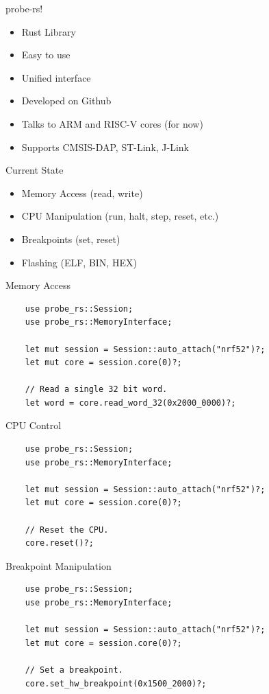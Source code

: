 \documentclass[aspectratio=1610,14pt,t]{beamer}
\begin{document}
\begin{frame}[c]{probe-rs!}
  \begin{itemize}
    \item Rust Library
    \item Easy to use
    \item Unified interface
    \item Developed on Github
    \item Talks to ARM and RISC-V cores (for now)
    \item Supports CMSIS-DAP, ST-Link, J-Link
  \end{itemize}
\end{frame}

\begin{frame}[c]{Current State}
  \begin{itemize}
    \item Memory Access (read, write)
    \item CPU Manipulation (run, halt, step, reset, etc.)
    \item Breakpoints (set, reset)
    \item Flashing (ELF, BIN, HEX)
  \end{itemize}
\end{frame}

\begin{frame}[c,fragile]{Memory Access}
  \begin{verbatim}
    use probe_rs::Session;
    use probe_rs::MemoryInterface;

    let mut session = Session::auto_attach("nrf52")?;
    let mut core = session.core(0)?;

    // Read a single 32 bit word.
    let word = core.read_word_32(0x2000_0000)?;
  \end{verbatim}
\end{frame}

\begin{frame}[c,fragile]{CPU Control}
  \begin{verbatim}
    use probe_rs::Session;
    use probe_rs::MemoryInterface;

    let mut session = Session::auto_attach("nrf52")?;
    let mut core = session.core(0)?;

    // Reset the CPU.
    core.reset()?;
  \end{verbatim}
\end{frame}

\begin{frame}[c,fragile]{Breakpoint Manipulation}
  \begin{verbatim}
    use probe_rs::Session;
    use probe_rs::MemoryInterface;

    let mut session = Session::auto_attach("nrf52")?;
    let mut core = session.core(0)?;

    // Set a breakpoint.
    core.set_hw_breakpoint(0x1500_2000)?;
  \end{verbatim}
\end{frame}
\end{document}
